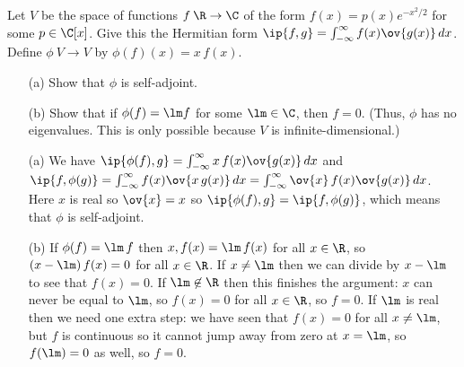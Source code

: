 \begin{exercise}
 Let $V$ be the space of functions $f\:\R\to\C$ of the form
 $f(x)=p(x)e^{-x^2/2}$ for some $p\in\C[x]$.  Give this the Hermitian
 form $\ip{f,g}=\int_{-\infty}^\infty f(x)\ov{g(x)}\,dx$.  Define
 $\phi\:V\to V$ by $\phi(f)(x)=x\,f(x)$.
 \begin{itemize}
  \item[(a)] Show that $\phi$ is self-adjoint.
  \item[(b)] Show that if $\phi(f)=\lm f$ for some $\lm\in\C$, then
   $f=0$.  (Thus, $\phi$ has no eigenvalues.  This is only possible
   because $V$ is infinite-dimensional.)
 \end{itemize}
\end{exercise}
\begin{solution}
 \begin{itemize}
  \item[(a)] We have
   $\ip{\phi(f),g}=\int_{-\infty}^\infty x\,f(x)\ov{g(x)}\,dx$ and
   $\ip{f,\phi(g)}=\int_{-\infty}^\infty f(x)\ov{x\,g(x)}\,dx=
   \int_{-\infty}^\infty \ov{x}\,f(x)\ov{g(x)}\,dx$.  Here $x$ is real
   so $\ov{x}=x$ so $\ip{\phi(f),g}=\ip{f,\phi(g)}$, which means that
   $\phi$ is self-adjoint. 
  \item[(b)] If $\phi(f)=\lm\,f$ then $x,f(x)=\lm\,f(x)$ for all
   $x\in\R$, so $(x-\lm)\,f(x)=0$ for all $x\in\R$.  If $x\neq\lm$
   then we can divide by $x-\lm$ to see that $f(x)=0$.  If
   $\lm\not\in\R$ then this finishes the argument: $x$ can never be
   equal to $\lm$, so $f(x)=0$ for all $x\in\R$, so $f=0$.  If $\lm$
   is real then we need one extra step: we have seen that $f(x)=0$ for
   all $x\neq\lm$, but $f$ is continuous so it cannot jump away from
   zero at $x=\lm$, so $f(\lm)=0$ as well, so $f=0$.
 \end{itemize}
\end{solution}

